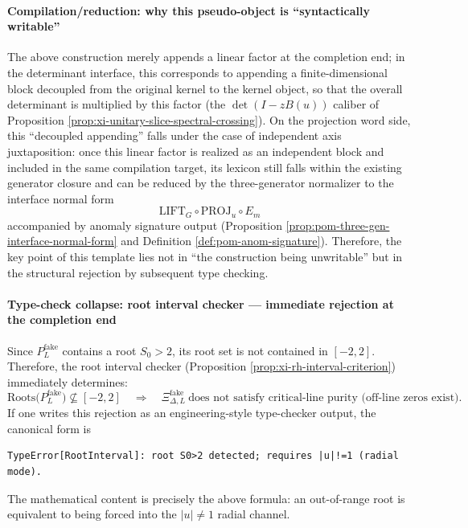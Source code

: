 \paragraph{Compilation/reduction: why this pseudo-object is ``syntactically writable''}
The above construction merely appends a linear factor at the completion end; in the determinant interface, this corresponds to appending a finite-dimensional block decoupled from the original kernel to the kernel object, so that the overall determinant is multiplied by this factor (the \(\det(I-zB(u))\) caliber of Proposition \ref{prop:xi-unitary-slice-spectral-crossing}).
On the projection word side, this ``decoupled appending'' falls under the case of independent axis juxtaposition: once this linear factor is realized as an independent block and included in the same compilation target, its lexicon still falls within the existing generator closure and can be reduced by the three-generator normalizer to the interface normal form
\[
\mathrm{LIFT}_G\circ \mathrm{PROJ}_u\circ E_m
\]
accompanied by anomaly signature output (Proposition \ref{prop:pom-three-gen-interface-normal-form} and Definition \ref{def:pom-anom-signature}).
Therefore, the key point of this template lies not in ``the construction being unwritable'' but in the structural rejection by subsequent type checking.

\paragraph{Type-check collapse: root interval checker --- immediate rejection at the completion end}
Since \(P^{\mathrm{fake}}_L\) contains a root \(S_0>2\), its root set is not contained in \([-2,2]\).
Therefore, the root interval checker (Proposition \ref{prop:xi-rh-interval-criterion}) immediately determines:
\[
\mathrm{Roots}\bigl(P^{\mathrm{fake}}_L\bigr)\not\subseteq [-2,2]
\quad\Longrightarrow\quad
\Xi^{\mathrm{fake}}_{\Delta,L}\ \text{does not satisfy critical-line purity (off-line zeros exist)}.
\]
If one writes this rejection as an engineering-style type-checker output, the canonical form is
\begin{verbatim}
TypeError[RootInterval]: root S0>2 detected; requires |u|!=1 (radial mode).
\end{verbatim}
The mathematical content is precisely the above formula: an out-of-range root is equivalent to being forced into the \(|u|\neq 1\) radial channel.


